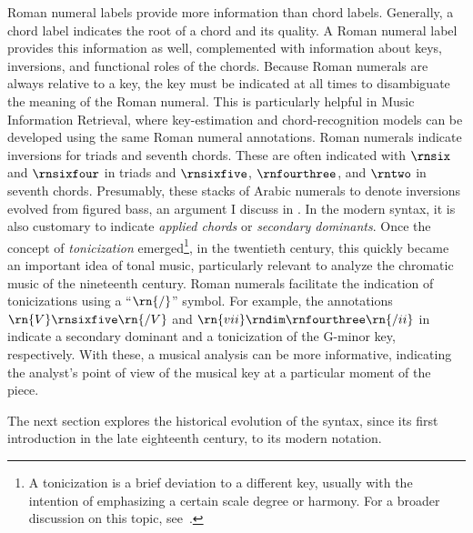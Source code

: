 

Roman numeral labels provide more information than chord
labels. Generally, a chord label indicates the root of a
chord and its quality. A Roman numeral label provides this
information as well, complemented with information about
keys, inversions, and functional roles of the chords.
Because Roman numerals are always relative to a key, the key
must be indicated at all times to disambiguate the meaning
of the Roman numeral. This is particularly helpful in Music
Information Retrieval, where key-estimation and
chord-recognition models can be developed using the same
Roman numeral annotations. Roman numerals indicate
inversions for triads and seventh chords. These are often
indicated with $\rnsix$ and $\rnsixfour$ in triads and
$\rnsixfive$, $\rnfourthree$, and $\rntwo$ in seventh
chords. Presumably, these stacks of Arabic numerals to
denote inversions evolved from figured bass, an argument I
discuss in . In
the modern syntax, it is also customary to indicate
\emph{applied chords} or \emph{secondary dominants}. Once
the concept of \emph{tonicization} emerged\footnote{A
tonicization is a brief deviation to a different key,
usually with the intention of emphasizing a certain scale
degree or harmony. For a broader discussion on this topic,
see~\textcite{napoleslopez2020local}.}, in the twentieth
century, this quickly became an important idea of tonal
music, particularly relevant to analyze the chromatic music
of the nineteenth century. Roman numerals facilitate the
indication of tonicizations using a ``$\rn{/}$'' symbol. For
example, the annotations $\rn{V}\rnsixfive\rn{/V}$ and
$\rn{vii}\rndim\rnfourthree\rn{/ii}$ in 
indicate a secondary dominant and a tonicization of the
G-minor key, respectively. With these, a musical analysis
can be more informative, indicating the analyst's point of
view of the musical key at a particular moment of the piece.

The next section explores the historical evolution of the
syntax, since its first introduction in the late eighteenth
century, to its modern notation.

